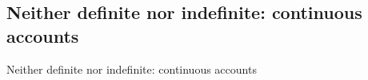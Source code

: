 



\subsection{Neither definite nor indefinite: continuous accounts} 

Neither definite nor indefinite: continuous accounts


